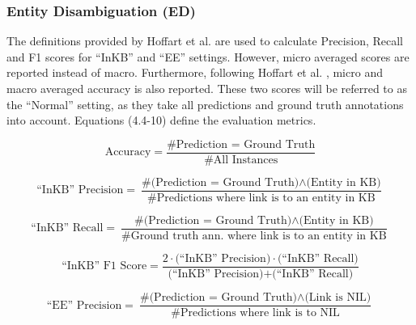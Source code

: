 \documentclass{report}
\theoremstyle{definition}
\theoremstyle{remark}
\begin{document}
\subsubsection{Entity Disambiguation (ED)}
The definitions provided by Hoffart et al. \cite{NILMentions} are used to calculate Precision, Recall and F1 scores for ``InKB'' and ``EE'' settings. However, micro averaged scores are reported instead of macro. Furthermore, following Hoffart et al. \cite{NILMentions}, micro and macro averaged accuracy is also reported. These two scores will be referred to as the ``Normal'' setting, as they take all predictions and ground truth annotations into account. Equations (4.4-10) define the evaluation metrics.
\begin{fleqn}
\begin{equation}
    \text{Accuracy} = \frac{\text{\# Prediction = Ground Truth}}{\text{\# All Instances}}
\end{equation}
\end{fleqn}
\begin{fleqn}
\begin{equation}
    \text{``InKB'' Precision} = \frac{\text{\# (Prediction = Ground Truth)} \land \text{(Entity in KB)}}{\text{\# Predictions where link is to an entity in KB}}
\end{equation}
\end{fleqn}
\begin{fleqn}
\begin{equation}
    \text{``InKB'' Recall} = \frac{\text{\# (Prediction = Ground Truth)} \land \text{(Entity in KB)}}{\text{\# Ground truth ann. where link is to an entity in KB}}
\end{equation}
\end{fleqn}
\begin{fleqn}
\begin{equation}
    \text{``InKB'' F1 Score} = \frac{2 \cdot \text{(``InKB'' Precision)} \cdot \text{(``InKB'' Recall)}}{\text{(``InKB'' Precision)} + \text{(``InKB'' Recall)}}
\end{equation}
\end{fleqn}

\begin{fleqn}
\begin{equation}
    \text{``EE'' Precision} = \frac{\text{\# (Prediction = Ground Truth)} \land \text{(Link is NIL)}}{\text{\# Predictions where link is to NIL}}
\end{equation}
\end{fleqn}
\end{document}
